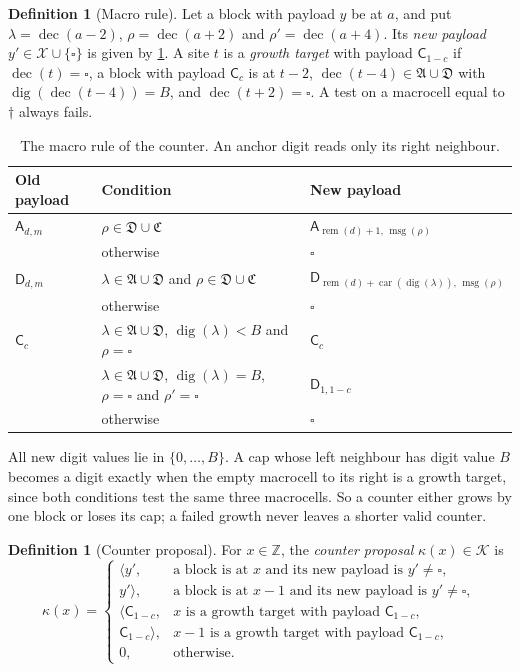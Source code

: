 \documentclass[11pt]{article}
\theoremstyle{plain}
\theoremstyle{definition}
\newtheorem{definition}[theorem]{Definition}
\theoremstyle{remark}
\newcommand{\Z}{\mathbb Z}
\newcommand{\Lh}[1]{\langle #1}
\newcommand{\Rh}[1]{#1\rangle}
\newcommand{\mA}{\mathsf A}
\newcommand{\mD}{\mathsf D}
\newcommand{\mC}{\mathsf C}
\newcommand{\blank}{\square}
\newcommand{\inv}{\dagger}
\newcommand{\dec}{\operatorname{dec}}
\newcommand{\digit}{\operatorname{dig}}
\newcommand{\msg}{\operatorname{msg}}
\newcommand{\rem}{\operatorname{rem}}
\newcommand{\car}{\operatorname{car}}
\newcommand{\Ks}{\mathcal K}
\newcommand{\Xs}{\mathcal X}
\begin{document}
\begin{definition}[Macro rule]\label{def:macro}
Let a block with payload $y$ be at $a$, and put $\lambda=\dec(a-2)$, $\rho=\dec(a+2)$ and $\rho'=\dec(a+4)$. Its \emph{new payload} $y'\in\Xs\cup\{\blank\}$ is given by \cref{tab:macro}. A site $t$ is a \emph{growth target} with payload $\mC_{1-c}$ if $\dec(t)=\blank$, a block with payload $\mC_c$ is at $t-2$, $\dec(t-4)\in\mathfrak A\cup\mathfrak D$ with $\digit(\dec(t-4))=B$, and $\dec(t+2)=\blank$. A test on a macrocell equal to $\inv$ always fails.
\end{definition}

\begin{table}[ht]
\centering\small
\begin{tabularx}{\textwidth}{@{}l >{\raggedright\arraybackslash}X l@{}}
\toprule
Old payload & Condition & New payload\\
\midrule
$\mA_{d,m}$ & $\rho\in\mathfrak D\cup\mathfrak C$ & $\mA_{\rem(d)+1,\,\msg(\rho)}$\\
 & otherwise & $\blank$\\[3pt]
$\mD_{d,m}$ & $\lambda\in\mathfrak A\cup\mathfrak D$ and $\rho\in\mathfrak D\cup\mathfrak C$ & $\mD_{\rem(d)+\car(\digit(\lambda)),\,\msg(\rho)}$\\
 & otherwise & $\blank$\\[3pt]
$\mC_c$ & $\lambda\in\mathfrak A\cup\mathfrak D$, $\digit(\lambda)<B$ and $\rho=\blank$ & $\mC_c$\\
 & $\lambda\in\mathfrak A\cup\mathfrak D$, $\digit(\lambda)=B$, $\rho=\blank$ and $\rho'=\blank$ & $\mD_{1,1-c}$\\
 & otherwise & $\blank$\\
\bottomrule
\end{tabularx}
\caption{The macro rule of the counter. An anchor digit reads only its right neighbour.}
\label{tab:macro}
\end{table}

All new digit values lie in $\{0,\dots,B\}$. A cap whose left neighbour has digit value $B$ becomes a digit exactly when the empty macrocell to its right is a growth target, since both conditions test the same three macrocells. So a counter either grows by one block or loses its cap; a failed growth never leaves a shorter valid counter.

\begin{definition}[Counter proposal]\label{def:compiled}
For $x\in\Z$, the \emph{counter proposal} $\kappa(x)\in\Ks$ is
\[
\kappa(x)=\begin{cases}
\Lh{y'},&\text{a block is at }x\text{ and its new payload is }y'\ne\blank,\\
\Rh{y'},&\text{a block is at }x-1\text{ and its new payload is }y'\ne\blank,\\
\Lh{\mC_{1-c}},&x\text{ is a growth target with payload }\mC_{1-c},\\
\Rh{\mC_{1-c}},&x-1\text{ is a growth target with payload }\mC_{1-c},\\
0,&\text{otherwise.}
\end{cases}
\]
\end{definition}
\end{document}
